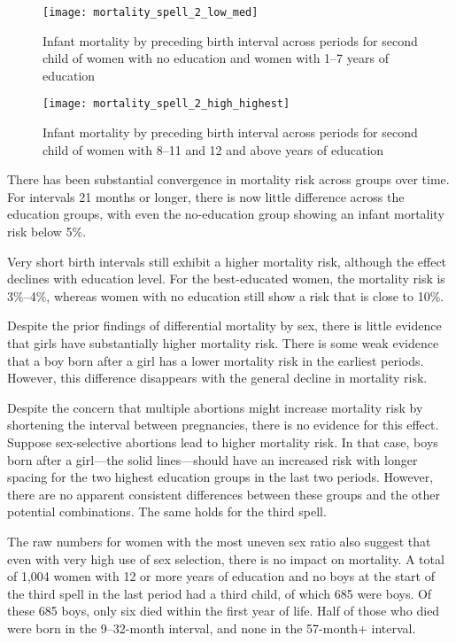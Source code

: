 \documentclass[12pt,letterpaper]{article}
\begin{document}
\begin{figure}
\centering
\texttt{[image: mortality\_spell\_2\_low\_med]}
\caption{Infant mortality by preceding birth interval across periods for second child of women with 
no education and women with 1--7 years of education}
\label{fig:mortality_low_med}
\end{figure}


\begin{figure}
\centering
\texttt{[image: mortality\_spell\_2\_high\_highest]}
\caption{Infant mortality by preceding birth interval across periods for second child of women with 
8--11 and 12 and above years of education}
\label{fig:mortality_high_highest}
\end{figure}



There has been substantial convergence in mortality risk across groups over time.
For intervals 21 months or longer, there is now little difference across 
the education groups, with even the no-education group showing an infant mortality risk 
below 5\%.

Very short birth intervals still exhibit a higher mortality risk, although the 
effect declines with education level.
For the best-educated women, the mortality risk is 3\%--4\%,
whereas women with no education still show a risk that is close to 10\%.

Despite the prior findings of differential mortality by sex, there is little evidence 
that girls have substantially higher mortality risk.
There is some weak evidence that a boy born after a girl has a lower mortality
risk in the earliest periods.
However, this difference disappears with the general decline in mortality risk. 

Despite the concern that multiple abortions might increase mortality risk by shortening 
the interval between pregnancies, there is no evidence for this effect. 
Suppose sex-selective abortions lead to higher mortality risk. In that case, boys born 
after a girl---the solid lines---should have an increased risk with longer spacing for 
the two highest education groups in the last two periods.
However, there are no apparent consistent differences between these groups and the other 
potential combinations. 
The same holds for the third spell.

The raw numbers for women with the most uneven sex ratio also suggest that even with 
very high use of sex selection, there is no impact on mortality. 
A total of 1,004 women with 12 or more years of education and no boys at the start of 
the third spell in the last period had a third child, of which 685 were boys. 
Of these 685 boys, only six died within the first year of life. 
Half of those who died were born in the 9--32-month interval, and none in the 57-month+ 
interval.
\end{document}
